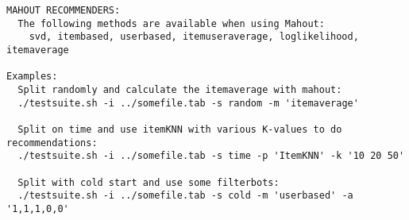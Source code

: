 \begin{lstlisting}
MAHOUT RECOMMENDERS:
  The following methods are available when using Mahout:
    svd, itembased, userbased, itemuseraverage, loglikelihood, itemaverage

Examples:
  Split randomly and calculate the itemaverage with mahout:
  ./testsuite.sh -i ../somefile.tab -s random -m 'itemaverage'

  Split on time and use itemKNN with various K-values to do recommendations:
  ./testsuite.sh -i ../somefile.tab -s time -p 'ItemKNN' -k '10 20 50'

  Split with cold start and use some filterbots:
  ./testsuite.sh -i ../somefile.tab -s cold -m 'userbased' -a '1,1,1,0,0'
\end{lstlisting}

